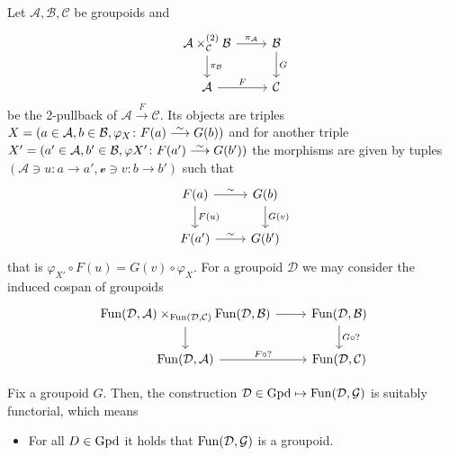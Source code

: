 \begin{construction}
	Let $ \mathcal{A} , \mathcal{B} , \mathcal{C} $ be groupoids
	and 
	\[
	\begin{tikzcd}
		\mathcal{A} \times_{\mathcal{ C }}^{(2)} \mathcal{B}
		\ar[r, " {\pi_{\mathcal{ A }}}"]
		\ar[d, " {\pi_{\mathcal{ B }}}"]
		&
		\mathcal{B}
		\ar[d ,"G"]
		\\
		\mathcal{A}
		\ar[r , "F"]
		&
		\mathcal{C}
	\end{tikzcd}
	\] 
	be the 2-pullback of $ \mathcal{ A } \xrightarrow{ F } \mathcal{ C }$.
	Its objects are triples $ X = ( a \in \mathcal{ A } , b \in \mathcal{ B } , \varphi_X \colon F ( a ) \isomorphism G ( b ) ) $ and for another triple $ X' = ( a' \in \mathcal{ A } , b' \in \mathcal{ B } , \varphi{X'} \colon F ( a' ) \isomorphism G ( b' ) ) $ the morphisms are given by tuples $  ( \mathcal{ A } \ni u \colon a \to a' , \mathcal{ v } \ni v \colon b \to b' ) $ such that 
	\[
	\begin{tikzcd}
		F ( a )
		\ar[r, " \sim "]
		\ar[d, " F ( u )"]
		&
		G ( b ) 
		\ar[ d , " G ( v ) "]
		\\
		F ( a ' )
		\ar[ r, " \sim "]
		&
		G ( b ' ) 
	\end{tikzcd}
	\] 
	that is $ \varphi_{X'} \circ F ( u ) = G ( v ) \circ \varphi_X.$
	For a groupoid $ \mathcal{ D } $ we may consider the induced cospan of groupoids 
	\[
		\begin{tikzcd}
			\Fun ( \mathcal{ D } , \mathcal{ A } ) \times_{ \Fun ( \mathcal{ D } , \mathcal{ C } )  } \Fun ( \mathcal{ D } , \mathcal{B } )
			\ar[d]
			\ar[r]
			&
			\Fun( \mathcal{ D } , \mathcal{ B } )
			\ar[d, " G \circ ? "]
			\\
			\Fun ( \mathcal{ D } , \mathcal{ A } )
			\ar[r, " F  \circ ? "]
			&
			\Fun( \mathcal{ D } , \mathcal{ C }) 
		\end{tikzcd}
	\]
	\begin{Interlude}
		Fix a groupoid $ G $.  
		Then, the construction $ \mathcal{ D } \in \operatorname{Gpd} \mapsto \operatorname{Fun} ( \mathcal{ D } , \mathcal{ G } )$ is suitably functorial, which means 
		\begin{itemize}
			\item 
			For all $ D \in \operatorname{Gpd} $ it holds that $ \operatorname{Fun} ( \mathcal{ D } , \mathcal{ G } ) $ is a groupoid.
			

\end{itemize}
\end{Interlude}
\end{construction}
